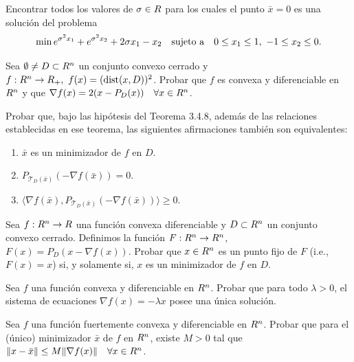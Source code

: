 \begin{exercise}\label{v1:ejer:3.4.22}
 Encontrar todos los valores de $\sigma \in R$ para los cuales el punto $\bar{x} = 0$ es una solución del problema
 \[
 \min e^{\sigma^2 x_1} + e^{\sigma^2 x_2} + 2\sigma x_1 - x_2 \quad \text{sujeto a} \quad 0 \le x_1 \le 1, \ -1 \le x_2 \le 0.
 \]
\end{exercise}

\begin{exercise}\label{v1:ejer:3.4.23}
 Sea $\emptyset \neq D \subset R^n$ un conjunto convexo cerrado y $f: R^n \to R_+, \ f(x) = (\operatorname{dist}(x, D))^2$. Probar que $f$ es convexa y diferenciable en $R^n$ y que $\nabla f(x) = 2(x - P_D(x)) \quad \forall x \in R^n$.
\end{exercise}

\begin{exercise}\label{v1:ejer:3.4.24}
 Probar que, bajo las hipótesis del Teorema 3.4.8, además de las relaciones establecidas en ese teorema, las siguientes afirmaciones también son equivalentes:
 \begin{enumerate}[label=(\alph*)]
  \item $\bar{x}$ es un minimizador de $f$ en $D$.
  \item $P_{\mathcal{T}_D(\bar{x})}(-\nabla f(\bar{x})) = 0$.
  \item $\langle \nabla f(\bar{x}), P_{\mathcal{T}_D(\bar{x})}(-\nabla f(\bar{x})) \rangle \ge 0$.
 \end{enumerate}
\end{exercise}

\begin{exercise}\label{v1:ejer:3.4.25}
 Sea $f: R^n \to R$ una función convexa diferenciable y $D \subset R^n$ un conjunto convexo cerrado. Definimos la función $F: R^n \to R^n$, $F(x) = P_D(x - \nabla f(x))$. Probar que $x \in R^n$ es un punto fijo de $F$ (i.e., $F(x) = x$) si, y solamente si, $x$ es un minimizador de $f$ en $D$.
\end{exercise}

\begin{exercise}\label{v1:ejer:3.4.26}
 Sea $f$ una función convexa y diferenciable en $R^n$. Probar que para todo $\lambda > 0$, el sistema de ecuaciones $\nabla f(x) = -\lambda x$ posee una única solución.
\end{exercise}

\begin{exercise}\label{v1:ejer:3.4.27}
 Sea $f$ una función fuertemente convexa y diferenciable en $R^n$. Probar que para el (único) minimizador $\bar{x}$ de $f$ en $R^n$, existe $M > 0$ tal que $\lVert x - \bar{x}\rVert \le M \lVert\nabla f(x)\rVert \quad \forall x \in R^n$.
\end{exercise}

